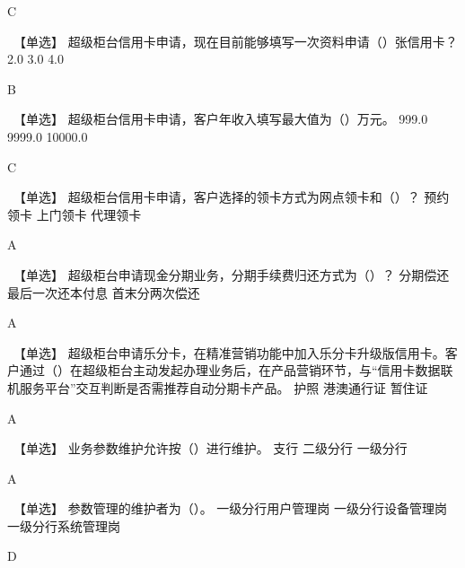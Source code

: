 \documentclass[kindlepaper]{BHCexam4kindle}
\begin{document}
\begin{questions}
\begin{solution} C \end{solution}
\qs　【单选】 超级柜台信用卡申请，现在目前能够填写一次资料申请（）张信用卡？ \xx
{} {  2.0 } { 3.0 } { 4.0 }
\begin{solution} B \end{solution}
\qs　【单选】 超级柜台信用卡申请，客户年收入填写最大值为（）万元。 \xx
{} {  999.0 } { 9999.0 } { 10000.0 }
\begin{solution} C \end{solution}
\qs　【单选】 超级柜台信用卡申请，客户选择的领卡方式为网点领卡和（）？ \xx
{} {  预约领卡 } { 上门领卡 } { 代理领卡 }
\begin{solution} A \end{solution}
\qs　【单选】 超级柜台申请现金分期业务，分期手续费归还方式为（）？ \xx
{} {  分期偿还 } { 最后一次还本付息 } { 首末分两次偿还 }
\begin{solution} A \end{solution}
\qs　【单选】 超级柜台申请乐分卡，在精准营销功能中加入乐分卡升级版信用卡。客户通过（）在超级柜台主动发起办理业务后，在产品营销环节，与“信用卡数据联机服务平台”交互判断是否需推荐自动分期卡产品。 \xx
{} {  护照 } { 港澳通行证 } { 暂住证 }
\begin{solution} A \end{solution}
\qs　【单选】 业务参数维护允许按（）进行维护。 \xx
{} {  支行 } { 二级分行 } { 一级分行 }
\begin{solution} A \end{solution}
\qs　【单选】 参数管理的维护者为（）。 \xx
{} {  一级分行用户管理岗 } { 一级分行设备管理岗 } { 一级分行系统管理岗 }
\begin{solution} D \end{solution}

\end{questions}
\end{document}
